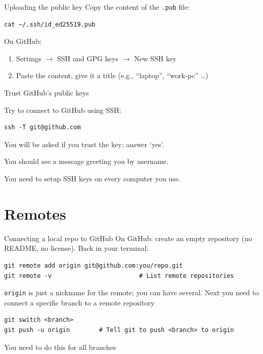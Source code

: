 \documentclass[11pt]{beamer}
\begin{document}
\begin{frame}[fragile]{Uploading the public key}
  Copy the content of the \texttt{.pub} file:
\begin{lstlisting}
cat ~/.ssh/id_ed25519.pub
\end{lstlisting}
  On GitHub:
  \begin{enumerate}
    \item Settings $\to$ SSH and GPG keys $\to$ New SSH key
    \item Paste the content, give it a title (e.g., ``laptop'',
      ``work-pc'' \dots)
  \end{enumerate}
\end{frame}

\begin{frame}[fragile]{Trust GitHub's public keys}

  Try to connect to GitHub using SSH{}:
\begin{lstlisting}
ssh -T git@github.com
\end{lstlisting}
You will be asked if you trust the key; answer `yes'.

  \vfill

  You should see a message greeting you by username.

  \vfill

  You need to setup SSH keys on every computer you use.


\end{frame}

\section{Remotes}

\begin{frame}[fragile]{Connecting a local repo to GitHub}
  On GitHub: create an empty repository (no README, no license).
  \vfill
  Back in your terminal:
\begin{lstlisting}
git remote add origin git@github.com:you/repo.git
git remote -v                        # List remote repositories
\end{lstlisting}
  \texttt{origin} is just a nickname for the remote; you can have
  several.
  \vfill
  Next you need to connect a specific branch to a remote repository
\begin{lstlisting}
git switch <branch>
git push -u origin        # Tell git to push <branch> to origin
\end{lstlisting}
You need to do this for all branches
\end{frame}
\end{document}
